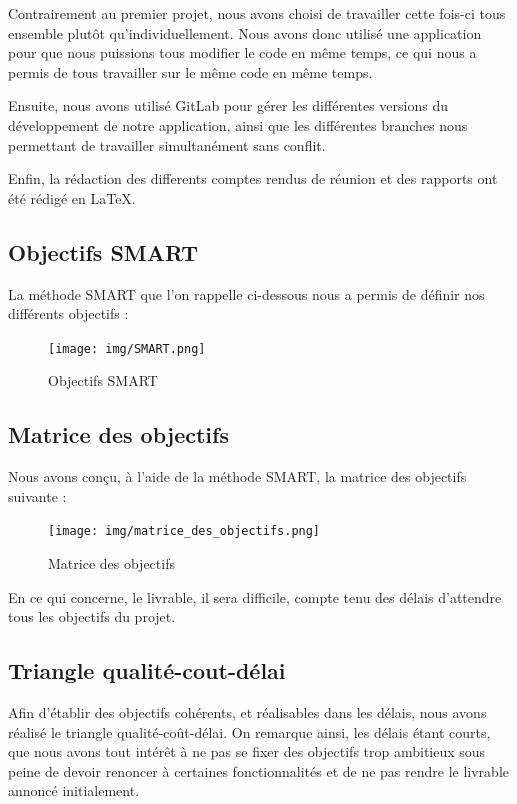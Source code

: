 \documentclass[french,a4paper]{article}
\begin{document}
    Contrairement au premier projet, nous avons choisi de travailler cette fois-ci tous ensemble plutôt qu'individuellement. Nous avons donc utilisé une
    application pour que nous puissions tous modifier le code en même temps, ce qui nous a permis de tous travailler sur le même code en même temps.

    Ensuite, nous avons utilisé GitLab pour gérer les différentes versions du développement de notre application, ainsi que les différentes
    branches nous permettant de travailler simultanément sans conflit.

    Enfin, la rédaction des differents comptes rendus de réunion et des rapports ont été rédigé en \LaTeX.

    \subsection{Objectifs SMART}
    La méthode SMART que l'on rappelle ci-dessous nous a permis de définir nos différents objectifs :

    \begin{figure}[H]
        \centering
        \texttt{[image: img/SMART.png]}
        \caption{Objectifs SMART}
    \end{figure}

    \subsection{Matrice des objectifs}
    Nous avons conçu, à l'aide de la méthode SMART, la matrice des objectifs suivante :

    \begin{figure}[H]
        \centering
        \texttt{[image: img/matrice\_des\_objectifs.png]}
        \caption{Matrice des objectifs}
    \end{figure}

    En ce qui concerne, le livrable, il sera difficile, compte tenu des délais d'attendre tous les objectifs du projet.
    \subsection{Triangle qualité-cout-délai}
    Afin d’établir des objectifs cohérents, et réalisables dans les délais, nous avons réalisé le triangle qualité-coût-délai. On remarque ainsi, les délais étant courts, que nous avons tout intérêt à ne pas se fixer des objectifs trop ambitieux sous peine de devoir renoncer à certaines fonctionnalités et de ne pas rendre le livrable annoncé initialement.
\end{document}
